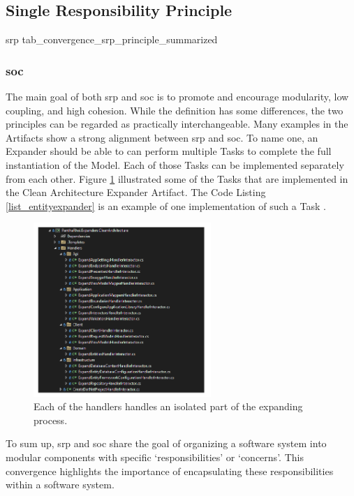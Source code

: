 \subsection{Single Responsibility Principle}

\compareTable
{\acrlong*{srp}}
{tab_convergence_srp_principle_summarized}
{\addEvalRow{\conv & \partconv & \partconv & \noconv}}

\subsubsection{\acrlong*{soc}}

The main goal of both \gls{srp} and \gls{soc} is to promote and encourage modularity, low
coupling, and high cohesion. While the definition has some differences, the two principles
can be regarded as practically interchangeable. Many examples in the Artifacts show a
strong alignment between \gls{srp} and \gls{soc}. To name one, an Expander should be able
to can perform multiple Tasks to complete the full instantiation of the Model. Each of
those Tasks can be implemented separately from each other. Figure \ref{fig_handlers}
illustrated some of the Tasks that are implemented in the Clean Architecture Expander
Artifact. The Code Listing \ref{list_entityexpander} is an example of one implementation
of such a Task .

\begin{figure}[H]
    \centering
    \includegraphics[width=0.6\textwidth]{figures/expander_handlers.pdf}
    \caption[handlers]{Each of the handlers handles an isolated part of the expanding process.}
    \label{fig_handlers}
\end{figure}

To sum up, \gls{srp} and \gls{soc} share the goal of organizing a software system into
modular components with specific \enquote*{responsibilities} or \enquote*{concerns}. This
convergence highlights the importance of encapsulating these responsibilities within a
software system.


